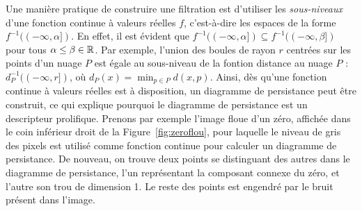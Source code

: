 
Une mani\`ere pratique de construire une filtration est d'utiliser les {\em sous-niveaux} d'une fonction continue \`a valeurs
r\'eelles $f$, c'est-\`a-dire les espaces de la forme $f^{-1}((-\infty,\alpha])$. En effet, il est \'evident que 
$f^{-1}((-\infty,\alpha])\subseteq f^{-1}((-\infty,\beta])$ pour tous $\alpha\leq\beta\in\mathbb{R}$. 
Par exemple, l'union des boules de rayon $r$ centr\'ees sur les points d'un nuage $P$ %
est \'egale au sous-niveau de la fontion distance au nuage $P$ : $d_P^{-1}((-\infty,r])$, o\`u $d_P(x)=\min_{p\in P}d(x,p)$.
Ainsi, d\`es qu'une fonction continue \`a valeurs r\'eelles est \`a disposition, un diagramme de persistance peut \^etre construit, ce qui explique
pourquoi le diagramme de persistance est un descripteur prolifique.
Prenons par exemple l'image floue d'un z\'ero, affich\'ee dans le coin inf\'erieur droit de la Figure~\ref{fig:zeroflou},
pour laquelle le niveau de gris des pixels est utilis\'e comme fonction continue pour calculer un diagramme de persistance. De nouveau, on trouve deux points se distinguant 
des autres dans le diagramme de persistance, l'un repr\'esentant la composant connexe du z\'ero, et l'autre son trou de dimension 1. Le reste 
des points est engendr\'e par le bruit pr\'esent dans l'image.

